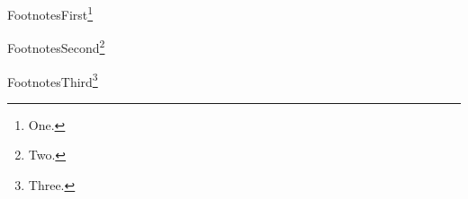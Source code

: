 \documentclass[aspectratio=169]{beamer}
\begin{document}
\begin{frame}{Footnotes}First\footnote{One.}\end{frame}
\begin{frame}{Footnotes}Second\footnote<2>{Two.}\end{frame}
\begin{frame}{Footnotes}Third\footnote{Three.}\end{frame}
\end{document}
